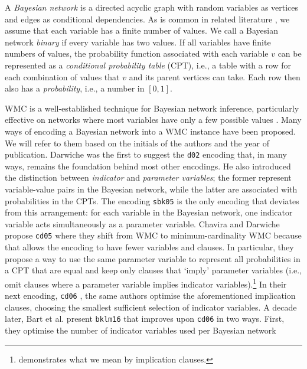 A \emph{Bayesian network} is a directed acyclic graph with random variables as
vertices and edges as conditional dependencies. As is common in related
literature
\cite{DBLP:conf/kr/Darwiche02,DBLP:conf/aaai/SangBK05}, we assume that each
variable has a finite number of values. We call a Bayesian network \emph{binary}
if every variable has two values. If all variables have finite numbers of
values, the probability function associated with each variable $v$ can be
represented as a \emph{conditional probability table} (CPT), i.e., a table
with a row for each combination of values that $v$ and its parent vertices can
take. Each row then also has a \emph{probability}, i.e., a number in $[0, 1]$.

WMC is a well-established technique for Bayesian network inference, particularly
effective on networks where most variables have only a few possible values
\cite{DBLP:conf/kr/Darwiche02}. Many ways of encoding a Bayesian network into a
WMC instance have been proposed. We will refer to them based on the initials of
the authors and the year of publication. Darwiche was the first to suggest the
\texttt{d02} \cite{DBLP:conf/kr/Darwiche02} encoding that, in many ways, remains
the foundation behind most other encodings. He also introduced the distinction
between \emph{indicator} and \emph{parameter variables}; the former represent
variable-value pairs in the Bayesian network, while the latter are associated
with probabilities in the CPTs. The encoding \texttt{sbk05}
\cite{DBLP:conf/aaai/SangBK05} is the only encoding that deviates from this
arrangement: for each variable in the Bayesian network, one indicator variable
acts simultaneously as a parameter variable. Chavira and Darwiche propose
\texttt{cd05} \cite{DBLP:conf/ijcai/ChaviraD05} where they shift from WMC to
minimum-cardinality WMC because that allows the encoding to have fewer variables
and clauses. In particular, they propose a way to use the same parameter
variable to represent all probabilities in a CPT that are equal and keep only
clauses that `imply' parameter variables (i.e., omit clauses where a parameter
variable implies indicator variables).\footnote{ demonstrates
  what we mean by implication clauses.} In their next encoding, \texttt{cd06}
\cite{DBLP:conf/sat/ChaviraD06}, the same authors optimise the aforementioned
implication clauses, choosing the smallest sufficient selection of indicator
variables. A decade later, Bart et al. present \texttt{bklm16}
\cite{DBLP:conf/ecai/BartKLM16} that improves upon \texttt{cd06} in two ways.
First, they optimise the number of indicator variables used per Bayesian network
